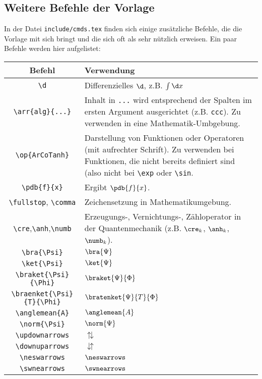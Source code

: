 \subsection{Weitere Befehle der Vorlage}
In der Datei \verb|include/cmds.tex| finden sich einige zusätzliche Befehle, 
die die Vorlage mit sich bringt und die sich oft als sehr nützlich erweisen. 
Ein paar Befehle werden hier aufgelistet:

\begin{tabular}{cp{10cm}}
    Befehl &                Verwendung\\\hline
    \verb|\d| &             Differenzielles $\d$, z.B. $\int \d x$\\
    \verb|\arr{alg}{...}| & Inhalt in \verb|...| wird entsprechend der 
                            Spalten im ersten Argument ausgerichtet (z.B. 
                            \verb|ccc|). Zu verwenden in eine 
                            Mathematik-Umbgebung.\\
    \verb|\op{ArCoTanh}|  & Darstellung von Funktionen oder Operatoren (mit 
                            aufrechter Schrift). Zu verwenden bei Funktionen, 
                            die nicht bereits definiert sind (also nicht bei 
                            \verb|\exp| oder \verb|\sin|.\\
    \verb|\pdb{f}{x}|     & Ergibt $\pdb{f}{x}$.\\
    \verb|\fullstop|, \verb|\comma| & Zeichensetzung in Mathematikumgebung.\\
    \verb|\cre|,\verb|\anh|,\verb|\numb| & Erzeugungs-, Vernichtungs-, 
                            Zähloperator in der Quantenmechanik (z.B. $\cre_k$, 
                            $\anh_k$, $\numb_k$).\\
    \verb|\bra{\Psi}|     & $\bra{\Psi}$\\
    \verb|\ket{\Psi}|     & $\ket{\Psi}$\\
    \verb|\braket{\Psi}{\Phi}| & $\braket{\Psi}{\Phi}$\\
    \verb|\braenket{\Psi}{T}{\Phi}| & $\bratenket{\Psi}{T}{\Phi}$\\
    \verb|\anglemean{A}|  & $\anglemean{A}$\\
    \verb|\norm{\Psi}|    & $\norm{\Psi}$\\
    \verb|\updownarrows|  & $\updownarrows$\\
    \verb|\downuparrows|  & $\downuparrows$\\
    \verb|\neswarrows|    & $\neswarrows$\\
    \verb|\swnearrows|    & $\swnearrows$
\end{tabular}
